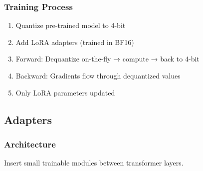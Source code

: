 \subsubsection{Training Process}

\begin{enumerate}
    \item Quantize pre-trained model to 4-bit
    \item Add LoRA adapters (trained in BF16)
    \item Forward: Dequantize on-the-fly → compute → back to 4-bit
    \item Backward: Gradients flow through dequantized values
    \item Only LoRA parameters updated
\end{enumerate}

\subsection{Adapters}

\subsubsection{Architecture}

Insert small trainable modules between transformer layers.

